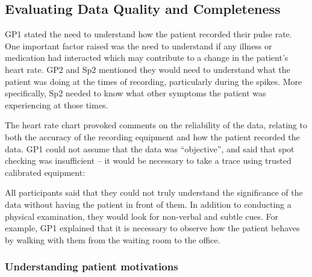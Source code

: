 \documentclass{sigchi}
\begin{document}

\subsection{Evaluating Data Quality and Completeness}

GP1 stated the need to understand how the patient recorded their pulse rate. One important factor raised was the need to understand if any illness or medication had interacted which may contribute to a change in the patient's heart rate. GP2 and Sp2 mentioned they would need to understand what the patient was doing at the times of recording, particularly during the spikes. More specifically, Sp2 needed to know what other symptoms the patient was experiencing at those times.

The heart rate chart provoked comments on the reliability of the data, relating to both the accuracy of the recording equipment and how the patient recorded the data. GP1 could not assume that the data was ``objective'', and said that spot checking was insufficient -- it would be necessary to take a trace using trusted calibrated equipment:


All participants said that they could not truly understand the significance of the data without having the patient in front of them.  In addition to conducting a physical examination, they would look for non-verbal and subtle cues.  For example, GP1 explained that it is necessary to observe how the patient behaves by walking with them from the waiting room to the office. 



\subsubsection{Understanding patient motivations}
\end{document}
